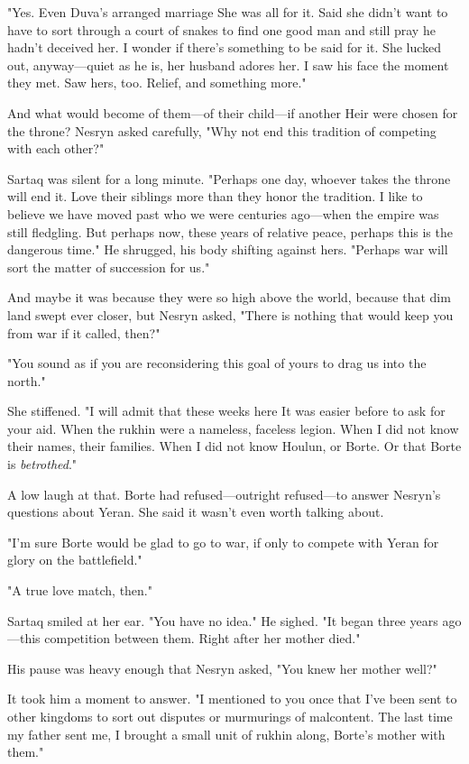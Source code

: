 "Yes. Even Duva's arranged marriage  She was all for it. Said she didn't want to have to sort through a court of snakes to find one good man and still pray he hadn't deceived her. I wonder if there's something to be said for it. She lucked out, anyway---quiet as he is, her husband adores her. I saw his face the moment they met. Saw hers, too. Relief, and  something more."

And what would become of them---of their child---if another Heir were chosen for the throne? Nesryn asked carefully, "Why not end this tradition of competing with each other?"

Sartaq was silent for a long minute. "Perhaps one day, whoever takes the throne will end it. Love their siblings more than they honor the tradition. I like to believe we have moved past who we were centuries ago---when the empire was still fledgling. But perhaps now, these years of relative peace, perhaps this is the dangerous time." He shrugged, his body shifting against hers. "Perhaps war will sort the matter of succession for us."

And maybe it was because they were so high above the world, because that dim land swept ever closer, but Nesryn asked, "There is nothing that would keep you from war if it called, then?"

"You sound as if you are reconsidering this goal of yours to drag us into the north."

She stiffened. "I will admit that these weeks here  It was easier before to ask for your aid. When the rukhin were a nameless, faceless legion. When I did not know their names, their families. When I did not know Houlun, or Borte. Or that Borte is \emph{betrothed}."

A low laugh at that. Borte had refused---outright refused---to answer Nesryn's questions about Yeran. She said it wasn't even worth talking about.

"I'm sure Borte would be glad to go to war, if only to compete with Yeran for glory on the battlefield."

"A true love match, then."

Sartaq smiled at her ear. "You have no idea." He sighed. "It began three years ago---this competition between them. Right after her mother died."

His pause was heavy enough that Nesryn asked, "You knew her mother well?"

It took him a moment to answer. "I mentioned to you once that I've been sent to other kingdoms to sort out disputes or murmurings of malcontent. The last time my father sent me, I brought a small unit of rukhin along, Borte's mother with them."

